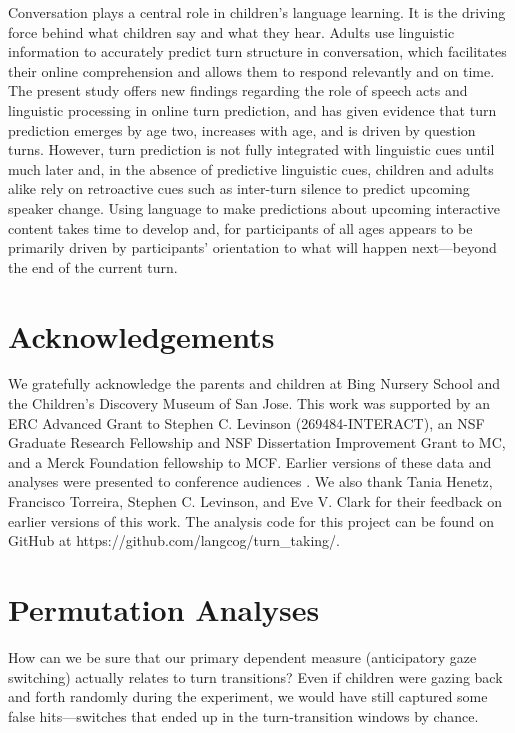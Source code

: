 \documentclass[authoryear, 12pt]{elsarticle}
\begin{document}
Conversation plays a central role in children's language learning. It is the driving force behind what children say and what they hear. Adults use linguistic information to accurately predict turn structure in conversation, which facilitates their online comprehension and allows them to respond relevantly and on time. The present study offers new findings regarding the role of speech acts and linguistic processing in online turn prediction, and has given evidence that turn prediction emerges by age two, increases with age, and is driven by question turns. However, turn prediction is not fully integrated with linguistic cues until much later and, in the absence of predictive linguistic cues, children and adults alike rely on retroactive cues such as inter-turn silence to predict upcoming speaker change. Using language to make predictions about upcoming interactive content takes time to develop and, for participants of all ages appears to be primarily driven by participants' orientation to what will happen next---beyond the end of the current turn.

\section*{Acknowledgements}

We gratefully acknowledge the parents and children at Bing Nursery School and the Children's Discovery Museum of San Jose. This work was supported by an ERC Advanced Grant to Stephen C. Levinson (269484-INTERACT), an NSF Graduate Research Fellowship and NSF Dissertation Improvement Grant to MC, and a Merck Foundation fellowship to MCF. Earlier versions of these data and analyses were presented to conference audiences \citep{casillas2012, casillas2013}. We also thank Tania Henetz, Francisco Torreira, Stephen C. Levinson, and Eve V. Clark for their feedback on earlier versions of this work. The analysis code for this project can be found on GitHub at https://github.com/langcog/turn\_taking/.



\clearpage

\appendix

\section{Permutation Analyses}
\label{sec:permutation}
\setcounter{figure}{0}
\setcounter{table}{0}  
How can we be sure that our primary dependent measure (anticipatory gaze switching) actually relates to turn transitions? Even if children were gazing back and forth randomly during the experiment, we would have still captured some false hits---switches that ended up in the turn-transition windows by chance.
\end{document}
